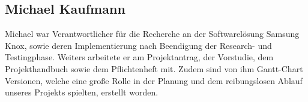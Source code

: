 \subsection{Michael Kaufmann}
Michael war Verantwortlicher für die Recherche an der Softwarelösung Samsung Knox, sowie deren Implementierung nach Beendigung der Research- und Testingphase. Weiters arbeitete er am Projektantrag, der Vorstudie, dem Projekthandbuch sowie dem Pflichtenheft mit. Zudem sind von ihm Gantt-Chart Versionen, welche eine große Rolle in der Planung und dem reibungslosen Ablauf unseres Projekts spielten, erstellt worden.

